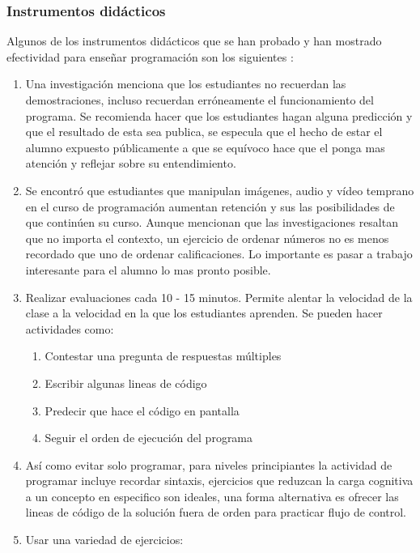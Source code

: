 \subsubsection{Instrumentos didácticos}
Algunos de los instrumentos didácticos que se han probado y han mostrado efectividad para enseñar programación son los siguientes \cite{Wilson2019} \cite{Brown2018}:
\begin{enumerate}
    \item Una investigación \cite{Brown2018} menciona que los estudiantes no recuerdan las demostraciones, incluso recuerdan erróneamente el funcionamiento del programa. Se recomienda hacer que los estudiantes hagan alguna predicción y que el resultado de esta sea publica, se especula que el hecho de estar el alumno expuesto públicamente a que se equívoco hace que el ponga mas atención y reflejar sobre su entendimiento.
    \item Se encontró que estudiantes que manipulan imágenes, audio y vídeo temprano en el curso de programación aumentan retención y sus las posibilidades de que continúen su curso. Aunque mencionan que las investigaciones resaltan que no importa el contexto, un ejercicio de ordenar números no es menos recordado que uno de ordenar calificaciones. Lo importante es pasar a trabajo interesante para el alumno lo mas pronto posible.
    \item Realizar evaluaciones cada 10 - 15 minutos. Permite alentar la velocidad de la clase a la velocidad en la que los estudiantes aprenden. Se pueden hacer actividades como:
        \begin{enumerate}
            \item Contestar una pregunta de respuestas múltiples
            \item Escribir algunas lineas de código
            \item Predecir que hace el código en pantalla
            \item Seguir el orden de ejecución del programa
        \end{enumerate}
    \item Así como evitar solo programar, para niveles principiantes la actividad de programar incluye recordar sintaxis, ejercicios que reduzcan la carga cognitiva a un concepto en especifico son ideales, una forma alternativa es ofrecer las lineas de código de la solución fuera de orden para practicar flujo de control.
    \item Usar una variedad de ejercicios:
        \begin{enumerate}

\end{enumerate}
\end{enumerate}
